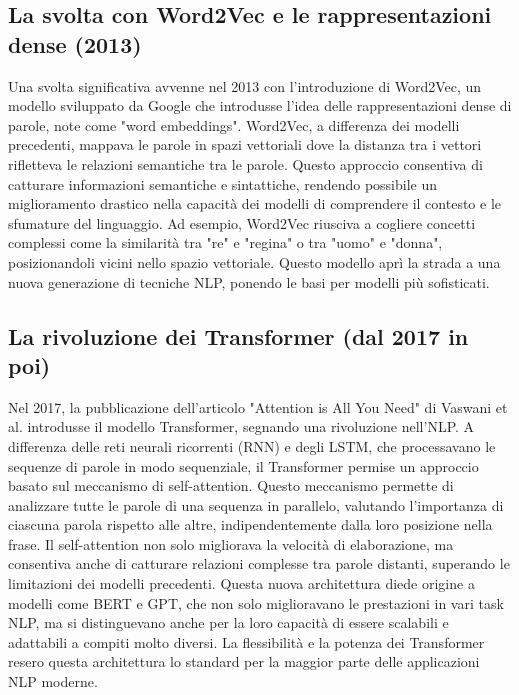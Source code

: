 \documentclass[target=mst,aauheader=,style=]{thud}
\begin{document}
\subsection{La svolta con Word2Vec e le rappresentazioni dense (2013)}
Una svolta significativa avvenne nel 2013 con l'introduzione di Word2Vec, un modello sviluppato da Google che introdusse l’idea delle rappresentazioni dense di parole, note come "word embeddings". Word2Vec, a differenza dei modelli precedenti, mappava le parole in spazi vettoriali dove la distanza tra i vettori rifletteva le relazioni semantiche tra le parole. Questo approccio consentiva di catturare informazioni semantiche e sintattiche, rendendo possibile un miglioramento drastico nella capacità dei modelli di comprendere il contesto e le sfumature del linguaggio. Ad esempio, Word2Vec riusciva a cogliere concetti complessi come la similarità tra "re" e "regina" o tra "uomo" e "donna", posizionandoli vicini nello spazio vettoriale. Questo modello aprì la strada a una nuova generazione di tecniche NLP, ponendo le basi per modelli più sofisticati.

\subsection{La rivoluzione dei Transformer (dal 2017 in poi)}
Nel 2017, la pubblicazione dell’articolo "Attention is All You Need" di Vaswani et al. introdusse il modello Transformer, segnando una rivoluzione nell’NLP. A differenza delle reti neurali ricorrenti (RNN) e degli LSTM, che processavano le sequenze di parole in modo sequenziale, il Transformer permise un approccio basato sul meccanismo di self-attention. Questo meccanismo permette di analizzare tutte le parole di una sequenza in parallelo, valutando l’importanza di ciascuna parola rispetto alle altre, indipendentemente dalla loro posizione nella frase. Il self-attention non solo migliorava la velocità di elaborazione, ma consentiva anche di catturare relazioni complesse tra parole distanti, superando le limitazioni dei modelli precedenti. Questa nuova architettura diede origine a modelli come BERT e GPT, che non solo miglioravano le prestazioni in vari task NLP, ma si distinguevano anche per la loro capacità di essere scalabili e adattabili a compiti molto diversi. La flessibilità e la potenza dei Transformer resero questa architettura lo standard per la maggior parte delle applicazioni NLP moderne.

\end{document}
